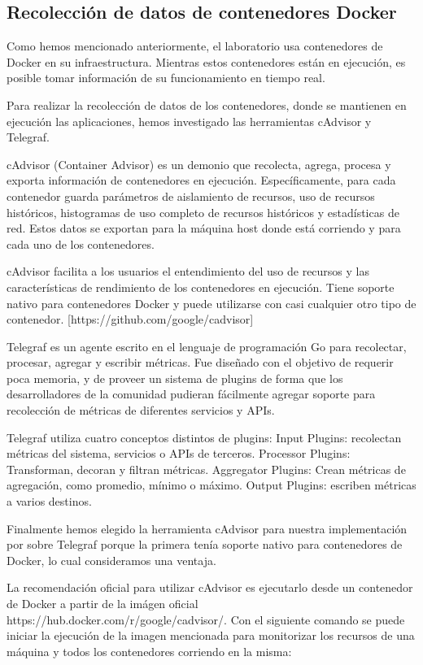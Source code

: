 \subsection{Recolección de datos de contenedores Docker}
\label{aplicaciones}
 
Como hemos mencionado anteriormente, el laboratorio usa contenedores de Docker en su infraestructura. Mientras estos contenedores están en ejecución, es posible tomar información de su funcionamiento en tiempo real.

Para realizar la recolección de datos de los contenedores, donde se mantienen en ejecución las aplicaciones, hemos investigado las herramientas cAdvisor y Telegraf. 

cAdvisor (Container Advisor) es un demonio que recolecta, agrega, procesa y exporta información de contenedores en ejecución. Específicamente, para cada contenedor guarda parámetros de aislamiento de recursos, uso de recursos históricos, histogramas de uso completo de recursos históricos y estadísticas de red. Estos datos se exportan para la máquina host donde está corriendo y para cada uno de los contenedores.

cAdvisor facilita a los usuarios el entendimiento del uso de recursos y las características de rendimiento de los contenedores en ejecución. Tiene soporte nativo para contenedores Docker y puede utilizarse con casi cualquier otro tipo de contenedor. [https://github.com/google/cadvisor]

Telegraf es un agente escrito en el lenguaje de programación Go para recolectar, procesar, agregar y escribir métricas. Fue diseñado con el objetivo de requerir poca memoria, y de proveer un sistema de plugins de forma que los desarrolladores de la comunidad pudieran fácilmente agregar soporte para recolección de métricas de diferentes servicios y APIs.

Telegraf utiliza cuatro conceptos distintos de plugins:
Input Plugins: recolectan métricas del sistema, servicios o APIs de terceros.
Processor Plugins: Transforman, decoran y filtran métricas.
Aggregator Plugins: Crean métricas de agregación, como promedio, mínimo o máximo.
Output Plugins: escriben métricas a varios destinos.

Finalmente hemos elegido la herramienta cAdvisor para nuestra implementación por sobre Telegraf porque la primera tenía soporte nativo para contenedores de Docker, lo cual consideramos una ventaja.

La recomendación oficial para utilizar cAdvisor es ejecutarlo desde un contenedor de Docker a partir de la imágen oficial  https://hub.docker.com/r/google/cadvisor/. Con el siguiente comando se puede iniciar la ejecución de la imagen mencionada para monitorizar los recursos de una máquina y todos los contenedores corriendo en la misma:

